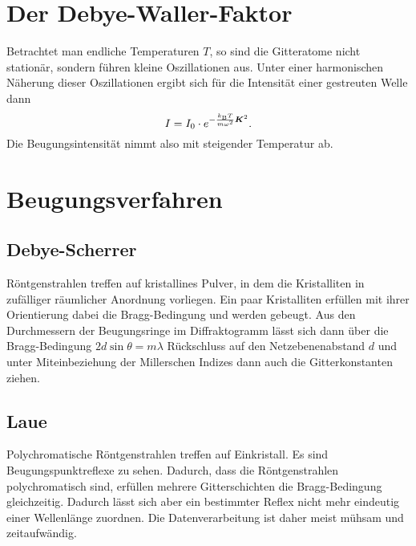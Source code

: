 \section{Der Debye-Waller-Faktor}
Betrachtet man endliche Temperaturen $T$, so sind die Gitteratome nicht stationär, sondern führen kleine Oszillationen aus.
Unter einer harmonischen Näherung dieser Oszillationen ergibt sich für die Intensität einer gestreuten Welle dann
\begin{equation*}
	I = I_0\cdot e^{-\frac{k_\text{B}T}{m\omega^2}\boldsymbol{K}^2}.
\end{equation*}
Die Beugungsintensität nimmt also mit steigender Temperatur ab.

\section{Beugungsverfahren}
\subsection{Debye-Scherrer}
Röntgenstrahlen treffen auf kristallines Pulver, in dem die Kristalliten in zufälliger räumlicher Anordnung vorliegen.
Ein paar Kristalliten erfüllen mit ihrer Orientierung dabei die Bragg-Bedingung und werden gebeugt.
Aus den Durchmessern der Beugungsringe im Diffraktogramm lässt sich dann über die Bragg-Bedingung $2d\sin\theta = m\lambda$ Rückschluss auf den Netzebenenabstand $d$ und unter Miteinbeziehung der Millerschen Indizes dann auch die Gitterkonstanten ziehen.

\subsection{Laue}
Polychromatische Röntgenstrahlen treffen auf Einkristall.
Es sind Beugungspunktreflexe zu sehen.
Dadurch, dass die Röntgenstrahlen polychromatisch sind, erfüllen mehrere Gitterschichten die Bragg-Bedingung gleichzeitig.
Dadurch lässt sich aber ein bestimmter Reflex nicht mehr eindeutig einer Wellenlänge zuordnen.
Die Datenverarbeitung ist daher meist mühsam und zeitaufwändig.

